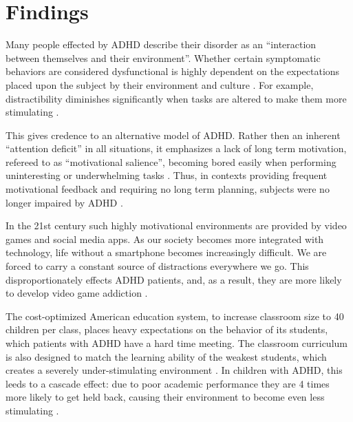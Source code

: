 \documentclass[a4paper,11pt]{article}
\begin{document}

  \section{Findings}
  Many people effected by ADHD describe their disorder as an
  ``interaction between themselves and their environment''.
  Whether certain symptomatic behaviors are considered dysfunctional
  is highly dependent on the expectations placed upon the subject by their environment and culture \cite{adhdcontext}.
  For example, distractibility diminishes significantly when tasks are altered to make them more stimulating \cite{delisle2011context}.

  This gives credence to an alternative model of ADHD.
  Rather then an inherent ``attention deficit'' in all situations,
  it emphasizes a lack of long term motivation, refereed to as ``motivational salience'',
  becoming bored easily when performing uninteresting or underwhelming tasks \cite{adhdcontext}.
  Thus, in contexts providing frequent motivational feedback and requiring no long term planning,
  subjects were no longer impaired by ADHD \cite{delisle2011context}.

  In the 21st century such highly motivational environments are provided by video games and social media apps.
  As our society becomes more integrated with technology,
  life without a smartphone becomes increasingly difficult.
  We are forced to carry a constant source of distractions everywhere we go.
  This disproportionately effects ADHD patients,
  and, as a result, they are more likely to develop video game addiction \cite{gameaddiction}.

  The cost-optimized American education system,
  to increase classroom size to 40 children per class,
  places heavy expectations on the behavior of its students,
  which patients with ADHD have a hard time meeting.
  The classroom curriculum is also designed to match the learning ability of the weakest students,
  which creates a severely under-stimulating environment \cite{controversy}.
  In children with ADHD, this leeds to a cascade effect:
  due to poor academic performance they are 4 times more likely to get held back,
  causing their environment to become even less stimulating \cite{heldback}.
\end{document}
